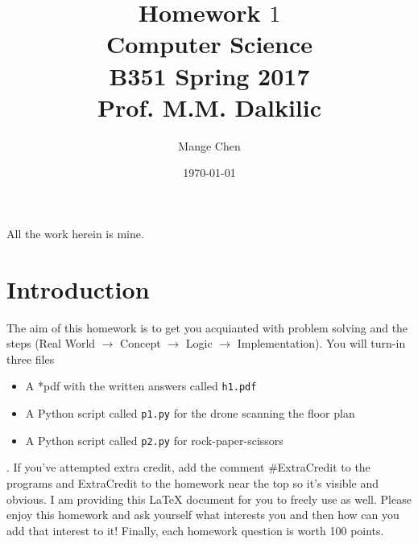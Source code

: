 \documentclass{article}
\begin{document}
\title{Homework $1$\\ Computer Science \\ B351 Spring 2017\\ Prof. M.M. Dalkilic}         %
\author{Mange Chen}        %
\date{\today}          %
\maketitle


\makeatother     %




\pagestyle{plain}
All the work herein is mine.
\section*{Introduction}
The aim of this homework is to get you acquianted with problem solving and the steps  (Real World $\rightarrow$ Concept $\rightarrow$ Logic  $\rightarrow$ Implementation).  You will turn-in three files\begin{itemize} \item A *pdf with the written answers called \texttt{h1.pdf} \item A Python script called \texttt{p1.py} for the drone scanning the floor plan \item  A Python script called  \texttt{p2.py} for rock-paper-scissors \end{itemize}.  If you've attempted extra credit, add the comment \#ExtraCredit to the programs and ExtraCredit to the homework near the top so it's visible and obvious.  I am providing this \LaTeX{} document for you to freely use as well. Please enjoy this homework and ask yourself what interests you and then how can you add that interest to it!  Finally, each homework question is worth 100 points.
\newpage
\end{document}
